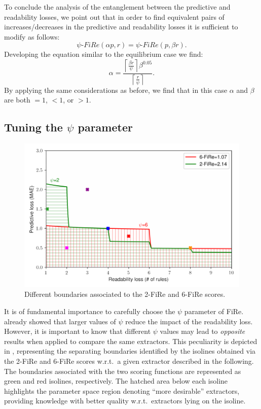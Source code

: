 \documentclass{article}
\newcommand{\fire}{FiRe}
\begin{document}
To conclude the analysis of the entanglement between the predictive and readability losses, we point out that in order to find equivalent pairs of increases/decreases in the predictive and readability losses it is sufficient to modify  as follows:
%
\begin{equation}\label{eq:equi3}
	\psi\textrm{-}\fire(\alpha p, r) = \psi\textrm{-}\fire(p, \beta r).
\end{equation}
%
Developing the equation similar to the equilibrium case we find:
%
\begin{equation}\label{eq:alpha2}
	\alpha = \frac{\left \lceil{\frac{\beta r}{\psi}}\right \rceil \beta^{0.05}}{\left \lceil{\frac{r}{\psi}}\right \rceil}.
\end{equation}
%
By applying the same considerations as before, we find that in this case $\alpha$ and $\beta$ are both $=1$, $<1$, or $>1$.

\subsection{Tuning the $\psi$ parameter}\label{ssec:psi}

\begin{figure}
	\centering
	\includegraphics[width=\linewidth]{figures/areas.pdf}
	\caption{Different boundaries associated to the 2-\fire{} and 6-\fire{} scores.}\label{fig:areas}
\end{figure}

It is of fundamental importance to carefully choose the $\psi$ parameter of \fire{}.
%
 already showed that larger values of $\psi$ reduce the impact of the readability loss.
%
However, it is important to know that different $\psi$ values may lead to \emph{opposite} results when applied to compare the same extractors.
%
This peculiarity is depicted in , representing the separating boundaries identified by the isolines obtained via the 2-\fire{} and 6-\fire{} scores w.r.t.\ a given extractor described in the following.
%
The boundaries associated with the two scoring functions are represented as green and red isolines, respectively.
%
The hatched area below each isoline highlights the parameter space region denoting ``more desirable'' extractors, providing knowledge with better quality w.r.t.\ extractors lying on the isoline.
\end{document}
